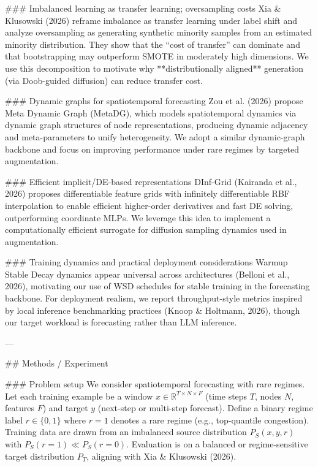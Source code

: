### Imbalanced learning as transfer learning; oversampling costs  
Xia & Klusowski (2026) reframe imbalance as transfer learning under label shift and analyze oversampling as generating synthetic minority samples from an estimated minority distribution. They show that the “cost of transfer” can dominate and that bootstrapping may outperform SMOTE in moderately high dimensions. We use this decomposition to motivate why **distributionally aligned** generation (via Doob-guided diffusion) can reduce transfer cost.

### Dynamic graphs for spatiotemporal forecasting  
Zou et al. (2026) propose Meta Dynamic Graph (MetaDG), which models spatiotemporal dynamics via dynamic graph structures of node representations, producing dynamic adjacency and meta-parameters to unify heterogeneity. We adopt a similar dynamic-graph backbone and focus on improving performance under rare regimes by targeted augmentation.

### Efficient implicit/DE-based representations  
DInf-Grid (Kairanda et al., 2026) proposes differentiable feature grids with infinitely differentiable RBF interpolation to enable efficient higher-order derivatives and fast DE solving, outperforming coordinate MLPs. We leverage this idea to implement a computationally efficient surrogate for diffusion sampling dynamics used in augmentation.

### Training dynamics and practical deployment considerations  
Warmup Stable Decay dynamics appear universal across architectures (Belloni et al., 2026), motivating our use of WSD schedules for stable training in the forecasting backbone. For deployment realism, we report throughput-style metrics inspired by local inference benchmarking practices (Knoop & Holtmann, 2026), though our target workload is forecasting rather than LLM inference.

---

## Methods / Experiment  

### Problem setup  
We consider spatiotemporal forecasting with rare regimes. Let each training example be a window \(x \in \mathbb{R}^{T \times N \times F}\) (time steps \(T\), nodes \(N\), features \(F\)) and target \(y\) (next-step or multi-step forecast). Define a binary regime label \(r \in \{0,1\}\) where \(r=1\) denotes a rare regime (e.g., top-quantile congestion). Training data are drawn from an imbalanced source distribution \(P_S(x,y,r)\) with \(P_S(r=1)\ll P_S(r=0)\). Evaluation is on a balanced or regime-sensitive target distribution \(P_T\), aligning with Xia & Klusowski (2026).

